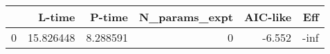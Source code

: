 \begin{tabular}{lrrrrr}
\toprule
{} &     L-time &    P-time &  N\_params\_expt &  AIC-like &  Eff \\
\midrule
0 &  15.826448 &  8.288591 &              0 &    -6.552 & -inf \\
\bottomrule
\end{tabular}
